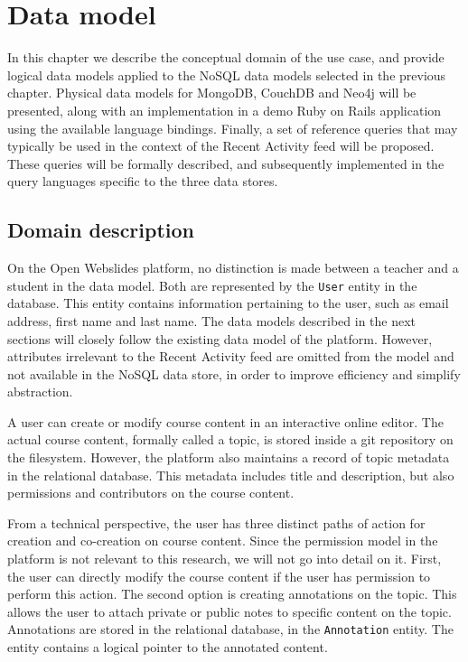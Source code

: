 \chapter{Data model}
\label{ch:data-model}

In this chapter we describe the conceptual domain of the use case, and provide logical data models applied to the NoSQL data models selected in the previous chapter.
Physical data models for MongoDB, CouchDB and Neo4j will be presented, along with an implementation in a demo Ruby on Rails application using the available language bindings.
Finally, a set of reference queries that may typically be used in the context of the Recent Activity feed will be proposed.
These queries will be formally described, and subsequently implemented in the query languages specific to the three data stores.

\section{Domain description}
\label{sec:domain-description}

On the Open Webslides platform, no distinction is made between a teacher and a student in the data model.
Both are represented by the \texttt{User} entity in the database.
This entity contains information pertaining to the user, such as email address, first name and last name.
The data models described in the next sections will closely follow the existing data model of the platform.
However, attributes irrelevant to the Recent Activity feed are omitted from the model and not available in the NoSQL data store, in order to improve efficiency and simplify abstraction.

A user can create or modify course content in an interactive online editor.
The actual course content, formally called a topic, is stored inside a git repository on the filesystem.
However, the platform also maintains a record of topic metadata in the relational database.
This metadata includes title and description, but also permissions and contributors on the course content.

From a technical perspective, the user has three distinct paths of action for creation and co-creation on course content.
Since the permission model in the platform is not relevant to this research, we will not go into detail on it.
First, the user can directly modify the course content if the user has permission to perform this action.
The second option is creating annotations on the topic.
This allows the user to attach private or public notes to specific content on the topic.
Annotations are stored in the relational database, in the \texttt{Annotation} entity.
The entity contains a logical pointer to the annotated content.

